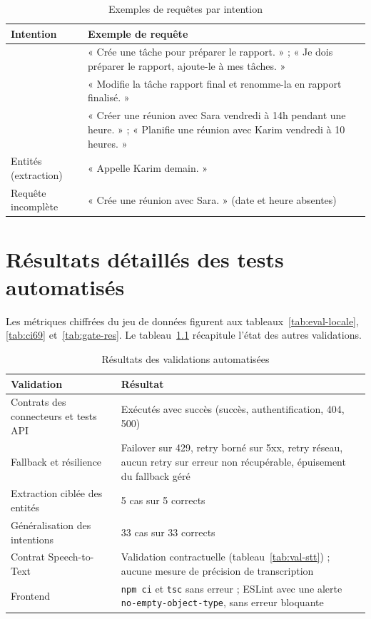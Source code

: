 \documentclass[11pt,a4paper,openany,oneside]{report}
\newcommand{\intent}[1]{\texttt{\detokenize{#1}}}
\begin{document}
\begin{table}[htbp]
\centering\small
\caption{Exemples de requêtes par intention}\label{tab:ann-dataset}
\begin{tabularx}{\textwidth}{@{}p{3cm}X@{}}
\toprule
\textbf{Intention} & \textbf{Exemple de requête} \\
\midrule
\intent{create_task} & « Crée une tâche pour préparer le rapport. » ; « Je dois préparer le rapport, ajoute-le à mes tâches. » \\
\intent{modify_task} & « Modifie la tâche rapport final et renomme-la en rapport finalisé. » \\
\intent{create_event} & « Créer une réunion avec Sara vendredi à 14h pendant une heure. » ; « Planifie une réunion avec Karim vendredi à 10 heures. » \\
Entités (extraction) & « Appelle Karim demain. » \\
Requête incomplète & « Crée une réunion avec Sara. » (date et heure absentes) \\
\bottomrule
\end{tabularx}
\end{table}

\chapter{Résultats détaillés des tests automatisés}\label{ann:resultats}
Les métriques chiffrées du jeu de données figurent aux tableaux~\ref{tab:eval-locale}, \ref{tab:ci69} et~\ref{tab:gate-res}. Le tableau~\ref{tab:ann-tests} récapitule l'état des autres validations.

\begin{table}[htbp]
\centering\small
\caption{Résultats des validations automatisées}\label{tab:ann-tests}
\begin{tabularx}{\textwidth}{@{}p{4.3cm}X@{}}
\toprule
\textbf{Validation} & \textbf{Résultat} \\
\midrule
Contrats des connecteurs et tests API & Exécutés avec succès (succès, authentification, 404, 500) \\
Fallback et résilience & Failover sur 429, retry borné sur 5xx, retry réseau, aucun retry sur erreur non récupérable, épuisement du fallback géré \\
Extraction ciblée des entités & 5 cas sur 5 corrects \\
Généralisation des intentions & 33 cas sur 33 corrects \\
Contrat Speech-to-Text & Validation contractuelle (tableau~\ref{tab:val-stt}) ; aucune mesure de précision de transcription \\
Frontend & \texttt{npm ci} et \texttt{tsc} sans erreur ; ESLint avec une alerte \texttt{no-empty-object-type}, sans erreur bloquante \\
\bottomrule
\end{tabularx}
\end{table}
\end{document}
